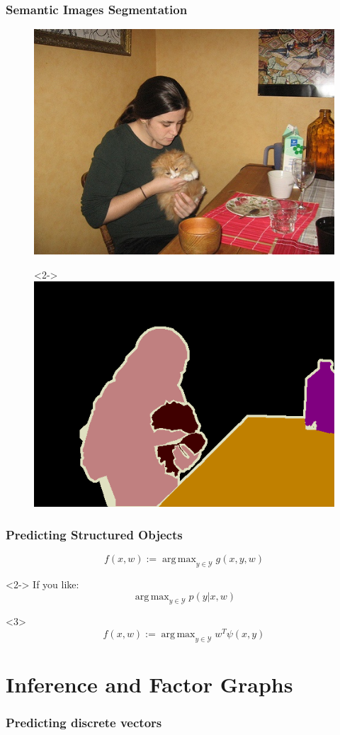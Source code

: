 \documentclass{beamer}
\DeclareMathOperator*{\argmax}{arg\,max}
\begin{document}
    \begin{frame}
        \frametitle{Semantic Images Segmentation}
        \begin{figure}
            \includegraphics[width=.45 \textwidth]{images/pascal}
            \begin{visibleenv}<2->
                \includegraphics[width=.45 \textwidth]{images/pascal_gt}
            \end{visibleenv}
        \end{figure}
    \end{frame}

    \begin{frame}
        \frametitle{Predicting Structured Objects}
        \[f(x, w) := \argmax_{y \in \mathcal{Y}}  g(x, y, w) \]
        \begin{visibleenv}<2->
        If you like:
        \[\argmax_{y \in \mathcal{Y}}  p(y|x, w) \]
        \end{visibleenv}
        
        \begin{visibleenv}<3>
        \[f(x, w) := \argmax_{y \in \mathcal{Y}}  w^T \psi(x, y) \]
        \end{visibleenv}
    \end{frame}

    \section{Inference and Factor Graphs}
    \begin{frame}
        \frametitle{Predicting discrete vectors}
    \end{frame}
\end{document}
